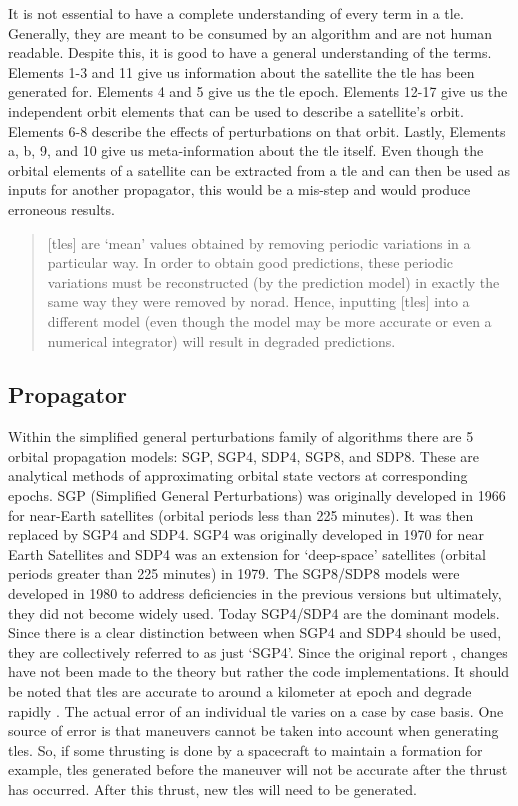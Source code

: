 It is not essential to have a complete understanding of every term in a
\gls{tle}. Generally, they are meant to be consumed by an algorithm and are not
human readable. Despite this, it is good to have a general understanding of the
terms.  Elements 1-3 and 11 give us information about the satellite the
\gls{tle} has been generated for. Elements 4 and 5 give us the \gls{tle} epoch.
Elements 12-17 give us the independent orbit elements that can be used to
describe a satellite's orbit. Elements 6-8 describe the effects of
perturbations on that orbit. Lastly, Elements a, b, 9, and 10 give us
meta-information about the \gls{tle} itself. Even though the orbital elements
of a satellite can be extracted from a \gls{tle} and can then be used as inputs
for another propagator, this would be a mis-step and would produce erroneous
results. 

\begin{quote}
[\glspl{tle}] are `mean' values obtained by removing
periodic variations in a particular way. In order to obtain good predictions,
these periodic variations must be reconstructed (by the prediction model) in
exactly the same way they were removed by \gls{norad}. Hence, inputting
[\glspl{tle}] into a different model (even though the model may be more accurate or even
a numerical integrator) will result in degraded predictions. \cite{hoots_spacetrack_1980}
\end{quote}


\subsection{Propagator}

Within the simplified general perturbations family of algorithms there are 5
orbital propagation models: SGP, SGP4, SDP4, SGP8, and SDP8. These are
analytical methods of approximating orbital state vectors at corresponding
epochs. SGP (Simplified General Perturbations) was originally developed in 1966
for near-Earth satellites (orbital periods less than 225 minutes). It was then
replaced by SGP4 and SDP4.  SGP4 was originally developed in 1970 for near
Earth Satellites and SDP4 was an extension for `deep-space' satellites (orbital
periods greater than 225 minutes) in 1979.  The SGP8/SDP8 models were developed
in 1980 to address deficiencies in the previous versions but ultimately, they
did not become widely used.  Today SGP4/SDP4 are the dominant models.  Since
there is a clear distinction between when SGP4 and SDP4 should be used, they
are collectively referred to as just `SGP4'. Since the original report
\cite{hoots_spacetrack_1980}, changes have not been made to the theory but
rather the code implementations.  It should be noted that \glspl{tle} are
accurate to around a kilometer at epoch and degrade rapidly
\cite{vallado_revisiting_2006}. The actual error of an individual \gls{tle}
varies on a case by case basis. One source of error is that maneuvers cannot be
taken into account when generating \glspl{tle}. So, if some thrusting is done
by a spacecraft to maintain a formation for example, \glspl{tle} generated
before the maneuver will not be accurate after the thrust has occurred. After
this thrust, new \glspl{tle} will need to be generated. 



